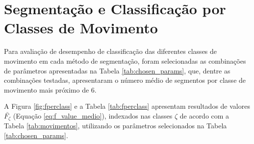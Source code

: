 		\section{Segmentação e Classificação por Classes de Movimento}
Para avaliação de desempenho de classificação das diferentes classes de movimento em cada método de segmentação, foram selecionadas as combinações de parâmetros apresentadas na Tabela \ref{tab:chosen_params}, que, dentre as combinações testadas, apresentaram o número médio de segmentos por classe de movimento mais próximo de 6.



A Figura \ref{fig:fperclass} e a Tabela \ref{tab:fperclass} apresentam resultados de valores $\bar{F_\zeta}$ (Equação \ref{eq:f_value_medio}), indexados nas classes $\zeta$ de acordo com a Tabela \ref{tab:movimentos}, utilizando os parâmetros selecionados na Tabela \ref{tab:chosen_params}.


